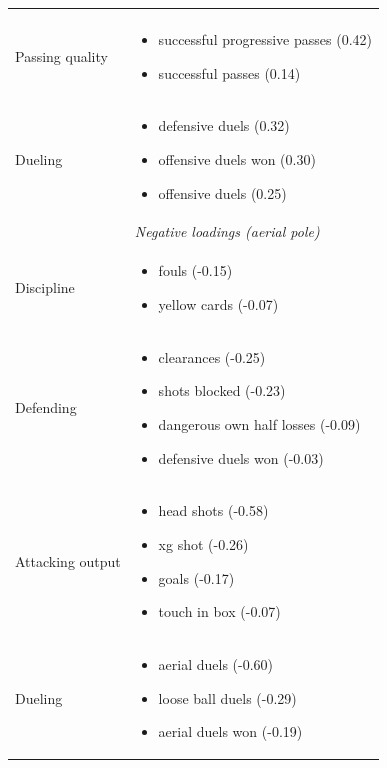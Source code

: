 \begin{longtable}{p{2.6cm}p{13cm}}
\begin{itemize}[nosep,leftmargin=1.1em,topsep=1pt]
  \end{itemize}\\
Passing quality & \begin{itemize}[nosep,leftmargin=1.1em,topsep=1pt]
    \item successful progressive passes (0.42)
    \item successful passes (0.14)
  \end{itemize}\\
Dueling & \begin{itemize}[nosep,leftmargin=1.1em,topsep=1pt]
    \item defensive duels (0.32)
    \item offensive duels won (0.30)
    \item offensive duels (0.25)
  \end{itemize}\\[4pt]
 & \textit{Negative loadings (aerial pole)}\\
Discipline & \begin{itemize}[nosep,leftmargin=1.1em,topsep=1pt]
    \item fouls (-0.15)
    \item yellow cards (-0.07)
  \end{itemize}\\
Defending & \begin{itemize}[nosep,leftmargin=1.1em,topsep=1pt]
    \item clearances (-0.25)
    \item shots blocked (-0.23)
    \item dangerous own half losses (-0.09)
    \item defensive duels won (-0.03)
  \end{itemize}\\
Attacking output & \begin{itemize}[nosep,leftmargin=1.1em,topsep=1pt]
    \item head shots (-0.58)
    \item xg shot (-0.26)
    \item goals (-0.17)
    \item touch in box (-0.07)
  \end{itemize}\\
Dueling & \begin{itemize}[nosep,leftmargin=1.1em,topsep=1pt]
    \item aerial duels (-0.60)
    \item loose ball duels (-0.29)
    \item aerial duels won (-0.19)

\end{itemize}
\end{longtable}
